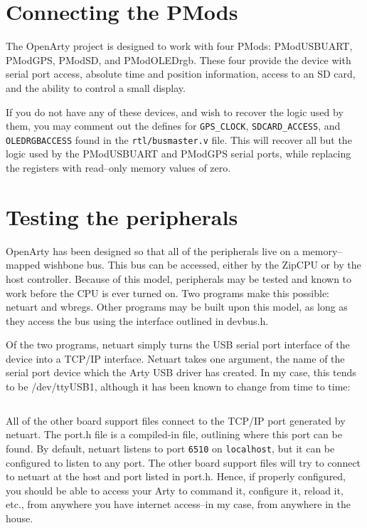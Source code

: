 \documentclass{gqtekspec}
\begin{document}
\section{Connecting the PMods}
The OpenArty project is designed to work with four PMods: PModUSBUART,
PModGPS, PModSD, and PModOLEDrgb.  These four provide the device with
serial port access, absolute time and position information, access to an
SD card, and the ability to control a small display. 

If you do not have any of these devices, and wish to recover the logic used
by them, you may comment out the defines for {\tt GPS\_CLOCK},
{\tt SDCARD\_ACCESS}, and {\tt OLEDRGBACCESS} found in the {\tt rtl/busmaster.v}
file.  This will recover all but the logic used by the PModUSBUART and PModGPS
serial ports, while replacing the registers with read--only memory values of
zero.


\section{Testing the peripherals}
OpenArty has been designed so that all of the peripherals live on a 
memory--mapped wishbone bus.  This bus can be accessed, either by the ZipCPU
or by the host controller.  Because of this model, peripherals may be tested
and known to work before the CPU is ever turned on.  Two programs make this
possible: netuart and wbregs.  Other programs may be built upon this model,
as long as they access the bus using the interface outlined in devbus.h.

Of the two programs, netuart simply turns the USB serial port interface of
the device into a TCP/IP interface.  Netuart takes one argument, the 
name of the serial port device which the Arty USB driver has created.  In
my case, this tends to be /dev/ttyUSB1, although it has been known to change
from time to time:

\begin{lstlisting}[language=bash]
% netuart /dev/ttyUSB1
\end{lstlisting} 

All of the other board support files connect to the TCP/IP port generated
by netuart.  The port.h file is a compiled-in file, outlining where this
port can be found.  By default, netuart listens to port {\tt 6510} on
{\tt localhost}, but it can be configured to listen to any port.  The other
board support files will try to connect to netuart at the host and port
listed in port.h.  Hence, if properly configured, you should be able to 
access your Arty to command it, configure it, reload it, etc., from anywhere
you have internet access--in my case, from anywhere in the house.
\end{document}
